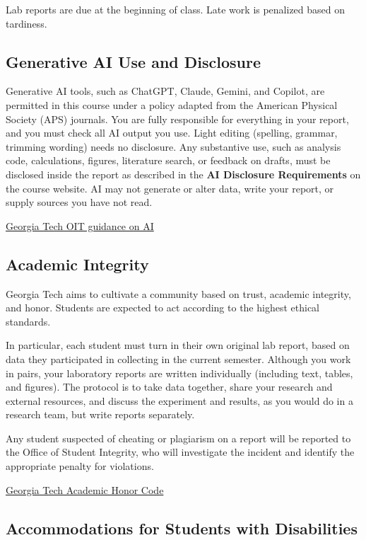 \documentclass[11pt]{article}
\begin{document}
Lab reports are due at the beginning of class. Late work is penalized based on tardiness.

\subsection*{Generative AI Use and Disclosure}

Generative AI tools, such as ChatGPT, Claude, Gemini, and Copilot, are permitted in this course under a policy adapted from the American Physical Society (APS) journals. You are fully responsible for everything in your report, and you must check all AI output you use. Light editing (spelling, grammar, trimming wording) needs no disclosure. Any substantive use, such as analysis code, calculations, figures, literature search, or feedback on drafts, must be disclosed inside the report as described in the \textbf{AI Disclosure Requirements} on the course website. AI may not generate or alter data, write your report, or supply sources you have not read.

\href{https://oit.gatech.edu/ai/guidance}{Georgia Tech OIT guidance on AI}

\subsection*{Academic Integrity}

Georgia Tech aims to cultivate a community based on trust, academic integrity, and honor. Students are expected to act according to the highest ethical standards.

In particular, each student must turn in their own original lab report, based on data they participated in collecting in the current semester. Although you work in pairs, your laboratory reports are written individually (including text, tables, and figures). The protocol is to take data together, share your research and external resources, and discuss the experiment and results, as you would do in a research team, but write reports separately.

Any student suspected of cheating or plagiarism on a report will be reported to the Office of Student Integrity, who will investigate the incident and identify the appropriate penalty for violations.

\href{https://osi.gatech.edu/students/honor-code}{Georgia Tech Academic Honor Code}

\subsection*{Accommodations for Students with Disabilities}
\end{document}
